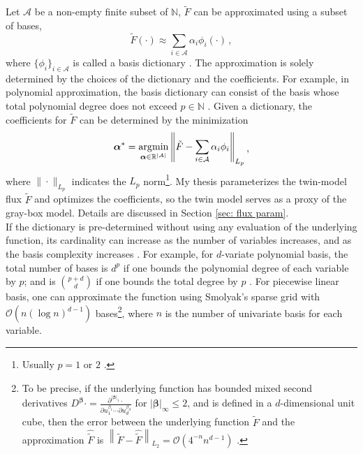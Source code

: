 Let $\mathcal{A}$ be a non-empty finite subset of $\mathbb{N}$,
$\tilde{F}$ can be approximated using a subset of bases, 
\begin{equation}
    \tilde{F}(\cdot) \approx \sum_{i\in \mathcal{A}} {\alpha_i} \phi_i(\cdot)\,,
    \label{eqn: linear param truncate}
\end{equation}
where $\{\phi_i\}_{i\in \mathcal{A}}$ is called a basis dictionary \cite{match pursuit}. 
The approximation is solely determined by the choices of the dictionary and the coefficients.
For example, in polynomial approximation, the basis dictionary can consist of
the basis whose total polynomial degree does not exceed $p\in \mathbb{N}$ \cite{PCE}.
Given a dictionary, the coefficients for $\tilde{F}$
can be determined by the minimization \cite{PCE}
\begin{equation}\begin{split}
    \boldsymbol{\alpha}^* = \operatorname*{\arg\!\min}_{\boldsymbol{\alpha}\in \mathbb{R}^{|\mathcal{A}|}}
    \left\| \tilde{F}-\sum_{i\in \mathcal{A}} \alpha_i \phi_i \right\|_{L_p}
\end{split}\,,
\label{eqn: least squares demo}
\end{equation}
where $\|\cdot\|_{L_p}$ indicates the $L_p$ norm\footnote{
    Usually $p=1$ \cite{L1 basis pursuit} or $2$ \cite{L2 frame, match pursuit}.
}.
My thesis parameterizes the twin-model flux $\tilde{F}$ and
optimizes the coefficients,
so the twin model serves as a proxy of the gray-box model. Details are discussed in 
Section \ref{sec: flux param}.\\

If the dictionary is pre-determined without using any evaluation of the underlying function,
its cardinality can increase as the number of variables increases, and
as the basis complexity increases \cite{PCE}.
For example, for $d$-variate polynomial basis, the total number of bases 
is $d^p$ if one bounds the polynomial degree of each variable by $p$; and 
is $\binom{p+d}{d}$ if one bounds the total degree by $p$ \cite{PCE}.
For piecewise linear basis,
one can approximate the function using
Smolyak's sparse grid with
$\mathcal{O}\left( n(\log n)^{d-1} \right)$ bases\footnote{
To be precise, if the underlying function has bounded mixed second derivatives
$D^{\boldsymbol{\beta}} \cdot = \frac{\partial^{|\boldsymbol{\beta}|_1}\cdot }{\partial
u_1^{\beta_1} \cdots \partial u_d^{\beta_d}}$ for $|\boldsymbol{\beta}|_\infty\le 2$,
and is defined in a $d$-dimensional unit cube, then the error between
the underlying function $\tilde{F}$ and the approximation $\hat{\tilde{F}}$ is 
$\left\| \tilde{F} - \hat{\tilde{F}} \right\|_{L_2} = \mathcal{O}(4^{-n} n^{d-1})$
\cite{Smolyak}.}, where $n$ is the number of univariate basis for each variable.\\


